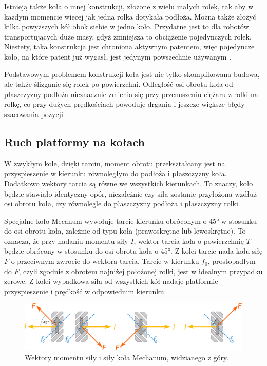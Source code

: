 	Istnieją także koła o innej konstrukcji, złożone z wielu małych rolek, tak aby w każdym momencie więcej jak jedna rolka dotykała podłoża.
	Można także złożyć kilka powyższych kół obok siebie w jedno koło.
	Przydatne jest to dla robotów transportujących duże masy, gdyż zmniejsza to obciążenie pojedynczych rolek.
	Niestety, taka konstrukcja jest chroniona aktywnym patentem, więc pojedyncze koło, na które patent już wygasł, jest jedynym powszechnie używanym \cite{paletobot}.

	Podstawowym problemem konstrukcji koła jest nie tylko skomplikowana budowa, ale także ślizganie się rolek po powierzchni.
	Odległość osi obrotu koła od płaszczyzny podłoża nieznacznie zmienia się przy przenoszeniu ciężaru z rolki na rolkę, co przy dużych prędkościach powoduje drgania i jeszcze większe błędy szacowania pozycji

	\subsection{Ruch platformy na kołach}
		W zwykłym kole, dzięki tarciu, moment obrotu przekształcany jest na przyspieszenie w kierunku równoległym do podłoża i płaszczyzny koła.
		Dodatkowo wektory tarcia są równe we wszystkich kierunkach. To znaczy, koło będzie stawiało identyczny opór, niezależnie czy siła
		zostanie przyłożona wzdłuż osi obrotu koła, czy równolegle do płaszczyzny podłoża i płaszczyzny rolki.
		
		Specjalne koło Mecanum wywołuje tarcie kierunku obróconym o 45° w stosunku do osi obrotu koła, zależnie od typu koła (prawoskrętne lub lewoskrętne). 
		To oznacza, że przy nadaniu momentu siły $I$, wektor tarcia koła o powierzchnię $T$ będzie obrócony w stosunku do osi obrotu koła o 45°.
		Z kolei tarcie nada kołu siłę $F$ o przeciwnym zwrocie do wektora tarcia.
		Tarcie w kierunku $f_0$, prostopadłym do $F$, czyli zgodnie z obrotem najniżej położonej rolki, jest w idealnym przypadku zerowe.
		Z kolei wypadkowa siła od wszystkich kół nadaje platformie przyspieszenie i prędkość w odpowiednim kierunku.

		\begin{figure}[H]
		\centering
		\includegraphics[width=\textwidth]{graphics/vectors.pdf}
		\caption{Wektory momentu siły i siły koła Mechanum, widzianego z góry.}
		\label{fig:wheel_vectors}
		\end{figure} 

